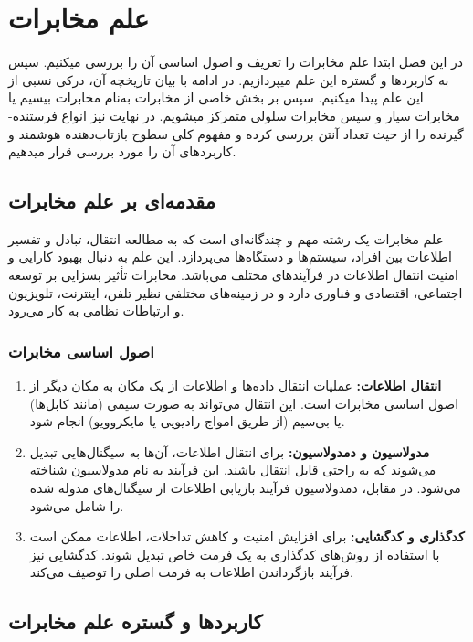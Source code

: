 \chapter{علم مخابرات}
در این فصل ابتدا علم مخابرات را تعریف و اصول اساسی آن را بررسی میکنیم. سپس به کاربردها و گستره این علم میپردازیم. در ادامه با بیان تاریخچه آن، درکی نسبی از این علم پیدا میکنیم. سپس بر بخش خاصی از مخابرات به‌نام مخابرات بیسیم یا مخابرات سیار و سپس مخابرات سلولی متمرکز میشویم. در نهایت نیز انواع فرستنده-گیرنده را از حیث تعداد آنتن بررسی کرده و مفهوم کلی سطوح بازتاب‌دهنده هوشمند و کاربردهای آن را مورد بررسی قرار میدهیم.
\newpage
\section{مقدمه‌ای بر علم مخابرات}
\cite{1}
علم مخابرات یک رشته مهم و چندگانه‌ای است که به مطالعه انتقال، تبادل و تفسیر اطلاعات بین افراد، سیستم‌ها و دستگاه‌ها می‌پردازد. این علم به دنبال بهبود کارایی و امنیت انتقال اطلاعات در فرآیندهای مختلف می‌باشد. مخابرات تأثیر بسزایی بر توسعه اجتماعی، اقتصادی و فناوری دارد و در زمینه‌های مختلفی نظیر تلفن، اینترنت، تلویزیون و ارتباطات نظامی به کار می‌رود.

\subsection{
	اصول اساسی مخابرات
}
\begin{enumerate}
	\item \textbf{
		انتقال اطلاعات:
	}
	 عملیات انتقال داده‌ها و اطلاعات از یک مکان به مکان دیگر از اصول اساسی مخابرات است. این انتقال می‌تواند به صورت سیمی (مانند کابل‌ها) یا بی‌سیم (از طریق امواج رادیویی یا مایکروویو) انجام شود.
	
	\item \textbf{مدولاسیون و دمدولاسیون:} برای انتقال اطلاعات، آن‌ها به سیگنال‌هایی تبدیل می‌شوند که به راحتی قابل انتقال باشند. این فرآیند به نام مدولاسیون شناخته می‌شود. در مقابل، دمدولاسیون فرآیند بازیابی اطلاعات از سیگنال‌های مدوله شده را شامل می‌شود.
	
	\item \textbf{کدگذاری و کدگشایی:} برای افزایش امنیت و کاهش تداخلات، اطلاعات ممکن است با استفاده از روش‌های کدگذاری به یک فرمت خاص تبدیل شوند. کدگشایی نیز فرآیند بازگرداندن اطلاعات به فرمت اصلی را توصیف می‌کند.
\end{enumerate}

\section{کاربردها و گستره علم مخابرات}
